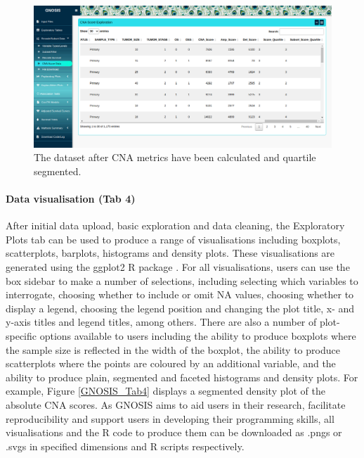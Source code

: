 \begin{figure}[!hp]
\center
\includegraphics[width=1\textwidth]{../figures/Chapter_3/GNOSIS_Fig3.png}
\caption[The dataset after CNA metrics have been calculated and quartile segmented.]{The dataset after CNA metrics have been calculated and quartile segmented.}
\label{GNOSIS_Fig3}
\end{figure}

\paragraph{Data visualisation (Tab 4)}
\hfill

\noindent After initial data upload, basic exploration and data cleaning, the Exploratory Plots tab can be used to produce a range of visualisations including boxplots, scatterplots, barplots, histograms and density plots. These visualisations are generated using the ggplot2 R package \citep{ggplot2}. For all visualisations, users can use the box sidebar to make a number of selections, including selecting which variables to interrogate, choosing whether to include or omit NA values, choosing whether to display a legend, choosing the legend position and changing the plot title, x- and y-axis titles and legend titles, among others. There are also a number of plot-specific options available to users including the ability to produce boxplots where the sample size is reflected in the width of the boxplot, the ability to produce scatterplots where the points are coloured by an additional variable, and the ability to produce plain, segmented and faceted histograms and density plots. For example, Figure \ref{GNOSIS_Tab4} displays a segmented density plot of the absolute CNA scores. As GNOSIS aims to aid users in their research, facilitate reproducibility and support users in developing their programming skills, all visualisations and the R code to produce them can be downloaded as .pngs or .svgs in specified dimensions and R scripts respectively.  

